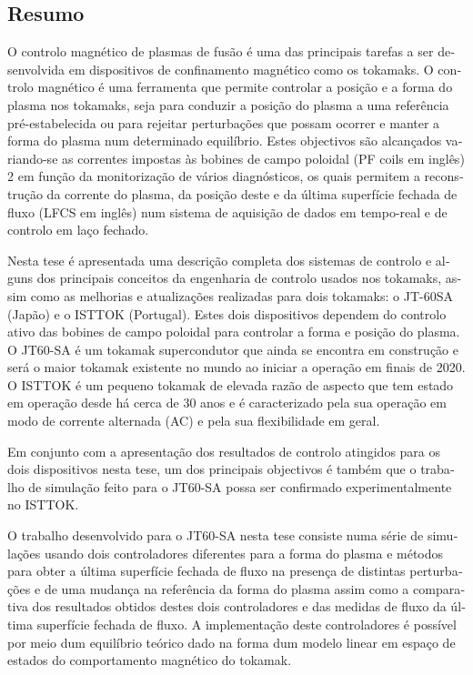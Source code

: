 \pagebreak
\begin{otherlanguage}{portuguese}
\chapter*{Resumo}

O  controlo magnético de plasmas de fusão é uma das principais tarefas a ser desenvolvida em dispositivos de confinamento magnético como os tokamaks. O controlo magnético é uma ferramenta que permite controlar a posição e a forma do plasma nos tokamaks, seja para conduzir a posição do plasma a uma referência pré-estabelecida ou para rejeitar perturbações que possam ocorrer e manter a forma do plasma num determinado equilíbrio. Estes objectivos são alcançados variando-se as correntes impostas às bobines de campo poloidal (PF coils em inglês) 2 em função da monitorização de vários diagnósticos, os quais permitem a reconstrução da corrente do plasma, da posição deste e da última superfície fechada de fluxo (LFCS em inglês) num sistema de aquisição de dados em tempo-real e de controlo em laço fechado. \smallskip

Nesta tese é apresentada uma descrição completa dos sistemas de controlo e alguns dos principais conceitos da engenharia de controlo usados nos tokamaks, assim como as melhorias e atualizações realizadas para dois tokamaks: o JT-60SA (Japão) e o ISTTOK (Portugal). Estes dois dispositivos dependem do controlo ativo das bobines de campo poloidal para controlar a forma e posição do plasma. O JT60-SA é um tokamak supercondutor que ainda se encontra em construção e será o maior tokamak existente no mundo ao iniciar a operação em finais de 2020. O ISTTOK é um pequeno tokamak de elevada razão de aspecto que tem estado em operação desde há cerca de 30 anos e é caracterizado pela sua operação em modo de corrente alternada (AC) e pela sua flexibilidade em geral.\smallskip

Em conjunto com a apresentação dos resultados de controlo atingidos para os dois dispositivos nesta tese, um dos principais objectivos é também que o trabalho de simulação feito para o JT60-SA possa ser confirmado experimentalmente no ISTTOK.\smallskip

O trabalho desenvolvido para o JT60-SA nesta tese consiste numa série de simulações usando dois controladores diferentes para a forma do plasma e métodos para obter a última superfície fechada de fluxo na presença de distintas perturbações e de uma mudança na referência da forma do plasma assim como a comparativa dos resultados obtidos destes dois controladores e  das medidas de fluxo da última superfície fechada de fluxo. A implementação deste controladores é  possível por meio dum equilíbrio teórico dado na forma dum modelo linear em espaço de estados do comportamento magnético do tokamak.\smallskip


\end{otherlanguage}
